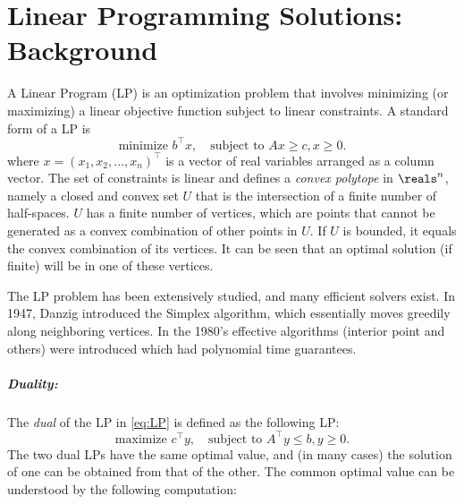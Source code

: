 
\chapter{Linear Programming Solutions: Background}
\label{chapter-discount:section:LP}


%
A Linear Program (LP) is an optimization problem that involves
minimizing (or maximizing) a linear objective function subject to
linear constraints. A standard form of a LP is
\begin{equation}\label{eq:LP}
 \textrm{minimize } {b^\top}x,   \quad \textrm{subject to } Ax \ge c,  x \ge 0.
\end{equation}
where $x = {({x_1},{x_2}, \ldots ,{x_n})^\top}$ is a vector of real
variables arranged as a column vector. The set of constraints is
linear and defines a \emph{convex polytope} in $\reals^n$, namely a
closed and convex set $U$ that is the intersection of a finite
number of half-spaces. $U$ has a finite number of vertices, which
are points that cannot be generated as a convex combination of other
points in  $U$. If  $U$ is bounded, it equals the convex combination
of its vertices. It can be seen that an optimal solution (if finite)
will be in one of these vertices.

The LP problem has been extensively studied, and many efficient
solvers exist. In 1947, Danzig introduced the Simplex algorithm,
which essentially moves greedily along neighboring vertices.  In the
1980's effective algorithms (interior point and others) were
introduced which had polynomial time guarantees.

\paragraph{Duality:} The \emph{dual} of the LP in \eqref{eq:LP} is defined as the following LP:
\begin{equation}\label{eq:LP_dual}
\textrm{maximize } {c^\top}y,   \quad \textrm{subject to } {A^\top}y
\le b,  y \ge 0.
\end{equation}
The two dual LPs have the same optimal value, and (in many cases)
the solution of one can be obtained from that of the other. The
common optimal value can be understood by the following computation:

